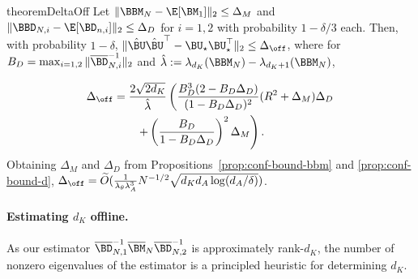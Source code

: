 \begin{restatable}{theorem}{DeltaOff}\label{thm:delta-off}\label{thm:subspace-est}
    Let $\|\BBM_N  - \E[\BM_1]\|_2 \leq \Delta_M$ and $\|\BBD_{N,i}  - \E[\BD_{n,i}]\|_2 \leq \Delta_D$ for $i=1,2$ with probability $1-\delta/3$ each. Then, with probability $1-\delta$, $\|\hat \BU \hat \BU^\top - \BU_\star \BU_\star^\top\|_2 \leq \Delta_{\off}$, where for $B_D = \max_{i=1,2}\|\overline{\BD}_{N,i}^{-1}\|_2$ and $\hat \lambda := \lambda_{d_K}(\BBM_N) - \lambda_{d_K+1}(\BBM_N)$,  
     
    \begin{align*}
        \Delta_{\off} &= \frac{2\sqrt{2d_K}}{\hat \lambda}\left(\frac{B_D^3(2-B_D\Delta_D)}{(1-B_D\Delta_D)^2}(R^2+\Delta_M)\Delta_D \right.\\
        & \left.\qquad + \left(\frac{B_D}{1-B_D\Delta_D}\right)^2\Delta_M\right).
    \end{align*}
    Obtaining $\Delta_M$ and $\Delta_D$ from Propositions~\ref{prop:conf-bound-bbm} and \ref{prop:conf-bound-d}, $\Delta_{\off} = \widetilde O({\frac{1}{\lambda_\theta\lambda_A^3}N^{-1/2}}\sqrt{d_Kd_A\log(d_A/\delta)})$.
\end{restatable}

\paragraph{Estimating $d_K$ offline.} As our estimator $\overline{\BD}_{N,1}^{-1} {\overline{\BM}_N} {\overline{\BD}_{N,2}^{-1}}$ is approximately rank-$d_K$, the number of nonzero eigenvalues of the estimator is a principled heuristic for determining $d_K$. 
 

